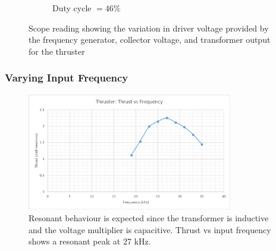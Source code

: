 \documentclass[11pt]{article}
\begin{document}
\begin{figure}[h!]
\begin{subfigure}{0.49\textwidth}
\caption{Duty cycle $=46\%$}
\label{fig:thruster_sc_22}
\end{subfigure}
\caption{\label{fig:thruster_duty} Scope reading showing the variation in driver voltage provided by the frequency generator, collector voltage, and transformer output for the thruster}
\end{figure}


\pagebreak
\subsubsection{Varying Input Frequency}

\begin{figure}[h!]
\centering
\includegraphics[width = 0.8\textwidth]{thruster_g3}
\caption{\label{fig:thruster_g3} Resonant behaviour is expected since the transformer is inductive and the voltage multiplier is capacitive. Thrust vs input frequency shows a resonant peak at 27 kHz.}
\end{figure}
\end{document}
